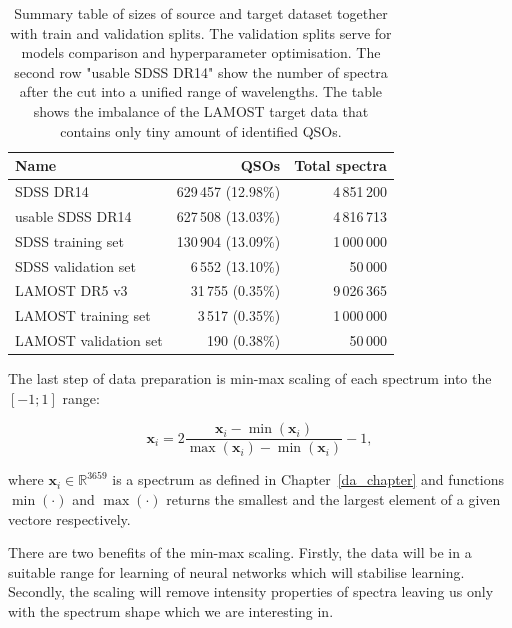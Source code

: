 \begin{table}
\begin{center}
\begin{tabular}{|l|r|r|}
	\hline
	Name & QSOs & Total spectra \\
	\hline \hline
	SDSS DR14 & 629\,457 (12.98\%) & 4\,851\,200 \\ \hline
	usable SDSS DR14 & 627\,508 (13.03\%) & 4\,816\,713 \\ \hline
	SDSS training set & 130\,904 (13.09\%) & 1\,000\,000 \\ \hline
	SDSS validation set & 6\,552 (13.10\%) & 50\,000 \\ \hline
	LAMOST DR5 v3 & 31\,755 (0.35\%) & 9\,026\,365 \\ \hline
	LAMOST training set & 3\,517 (0.35\%) & 1\,000\,000 \\ \hline
	LAMOST validation set & 190 (0.38\%) & 50\,000 \\ \hline
\end{tabular}
\end{center}
\caption[Sizes of source and target datasets]{
	Summary table of sizes of source and target dataset
	together with train and validation splits.
	The validation splits serve for models comparison
	and hyperparameter optimisation.
	The second row "usable SDSS DR14" show the number of spectra
	after the cut into a unified range of wavelengths.
	The table shows the imbalance of the LAMOST target data
	that contains only tiny amount of identified QSOs.
	}
\label{datasets_sizes}
\end{table}

The last step of data preparation is min-max scaling of each spectrum into the \([-1; 1]\) range:

\begin{equation}
	\mathbf{x}_i = 2 \frac{\mathbf{x}_i - \min(\mathbf{x}_i)}{
		\max(\mathbf{x}_i) - \min(\mathbf{x}_i)} - 1,
\end{equation}

where \(\mathbf{x}_i \in \mathbb{R}^{3659}\) is a spectrum as defined in Chapter~\ref{da_chapter}
and functions \(\min(\cdot)\) and \(\max(\cdot)\) returns the smallest and the largest element of a given vectore respectively.

There are two benefits of the min-max scaling.
Firstly, the data will be in a suitable range for learning of neural networks
which will stabilise learning.
Secondly, the scaling will remove intensity properties of spectra
leaving us only with the spectrum shape which we are interesting in.

